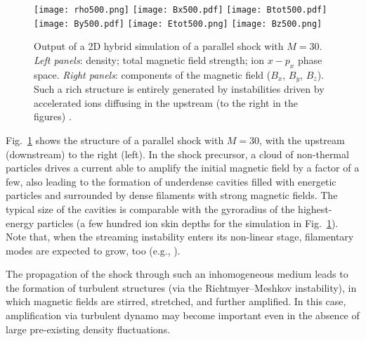 \documentclass[varenna]{cimento}
\begin{document}
\begin{figure}
\begin{center}
\texttt{[image: rho500.png]}
\texttt{[image: Bx500.pdf]}
\texttt{[image: Btot500.pdf]}
\texttt{[image: By500.pdf]}
\texttt{[image: Etot500.png]} 
\texttt{[image: Bz500.png]}
\end{center}
\vspace{-0.5cm}
\caption{\label{fig:hybrid}
Output of a 2D hybrid simulation of a parallel shock with $M=30$. 
\emph{Left panels}: density; total magnetic field strength; ion $x-p_x$ phase space. \emph{Right panels}: components of the magnetic field ($B_x$, $B_y$, $B_z$). 
Such a rich structure is entirely generated by instabilities driven by accelerated ions diffusing in the upstream (to the right in the figures) \cite{caprioli+13}.}
\vspace{-0.5cm}
\end{figure}

Fig.~\ref{fig:hybrid} shows the structure of a parallel shock with $M=30$, with the upstream (downstream) to the right (left).
In the shock precursor, a cloud of non-thermal particles drives a current able to amplify the initial magnetic field by a factor of a few, also leading to the formation of underdense cavities filled with energetic particles and surrounded by dense filaments with strong magnetic fields.
The typical size of the cavities is comparable with the gyroradius of the highest-energy particles (a few hundred ion skin depths for the simulation in Fig.~\ref{fig:hybrid}).
Note that, when the streaming instability enters its non-linear stage, filamentary modes are expected to grow, too (e.g., \cite{reville+12,caprioli+13,bykov+13}). 

The propagation of the shock through such an inhomogeneous medium leads to the formation of turbulent structures (via the Richtmyer--Meshkov instability), in which magnetic fields are stirred, stretched, and further amplified.
In this case, amplification via turbulent dynamo may become important even in the absence of large pre-existing density fluctuations.
\end{document}
